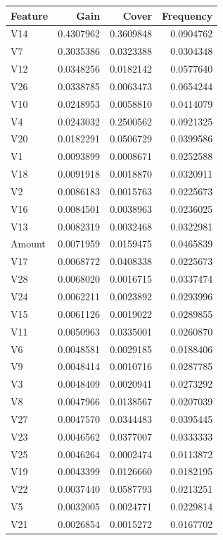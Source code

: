 \documentclass[]{article}
\begin{document}
\begin{table}[H]
\centering\begingroup\fontsize{10}{12}\selectfont

\begin{tabular}{l|r|r|r}
\hline
Feature & Gain & Cover & Frequency\\
\hline
V14 & 0.4307962 & 0.3609848 & 0.0904762\\
\hline
V7 & 0.3035386 & 0.0323388 & 0.0304348\\
\hline
V12 & 0.0348256 & 0.0182142 & 0.0577640\\
\hline
V26 & 0.0338785 & 0.0063473 & 0.0654244\\
\hline
V10 & 0.0248953 & 0.0058810 & 0.0414079\\
\hline
V4 & 0.0243032 & 0.2500562 & 0.0921325\\
\hline
V20 & 0.0182291 & 0.0506729 & 0.0399586\\
\hline
V1 & 0.0093899 & 0.0008671 & 0.0252588\\
\hline
V18 & 0.0091918 & 0.0018870 & 0.0320911\\
\hline
V2 & 0.0086183 & 0.0015763 & 0.0225673\\
\hline
V16 & 0.0084501 & 0.0038963 & 0.0236025\\
\hline
V13 & 0.0082319 & 0.0032468 & 0.0322981\\
\hline
Amount & 0.0071959 & 0.0159475 & 0.0465839\\
\hline
V17 & 0.0068772 & 0.0408338 & 0.0225673\\
\hline
V28 & 0.0068020 & 0.0016715 & 0.0337474\\
\hline
V24 & 0.0062211 & 0.0023892 & 0.0293996\\
\hline
V15 & 0.0061126 & 0.0019022 & 0.0289855\\
\hline
V11 & 0.0050963 & 0.0335001 & 0.0260870\\
\hline
V6 & 0.0048581 & 0.0029185 & 0.0188406\\
\hline
V9 & 0.0048414 & 0.0010716 & 0.0287785\\
\hline
V3 & 0.0048409 & 0.0020941 & 0.0273292\\
\hline
V8 & 0.0047966 & 0.0138567 & 0.0207039\\
\hline
V27 & 0.0047570 & 0.0344483 & 0.0395445\\
\hline
V23 & 0.0046562 & 0.0377007 & 0.0333333\\
\hline
V25 & 0.0046264 & 0.0002474 & 0.0113872\\
\hline
V19 & 0.0043399 & 0.0126660 & 0.0182195\\
\hline
V22 & 0.0037440 & 0.0587793 & 0.0213251\\
\hline
V5 & 0.0032005 & 0.0024771 & 0.0229814\\
\hline
V21 & 0.0026854 & 0.0015272 & 0.0167702\\
\hline
\end{tabular}
\endgroup{}
\end{table}
\newpage
\end{document}
